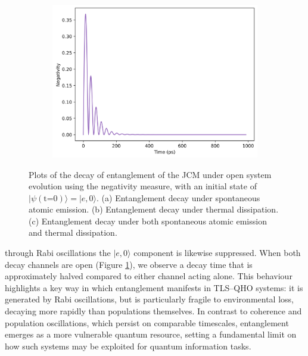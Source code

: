 \documentclass[11pt]{article}
\begin{document}
\begin{figure}[H]
    \vspace{0.5cm}
    
    \begin{subfigure}{0.45\textwidth}
        \centering
        \includegraphics[width=\linewidth]{Research Project/Code/results/JCM/OQS_Neg_Both.png}
        \caption{}
        \label{fig:JCM_OQS_Neg_Both}
    \end{subfigure}
    \hfill
    \caption{Plots of the decay of entanglement of the JCM under open system evolution using the negativity measure, with an initial state of $|\psi (\text{t=0})\rangle = |e, 0\rangle$. (a) Entanglement decay under spontaneous atomic emission. (b) Entanglement decay under thermal dissipation. (c) Entanglement decay under both spontaneous atomic emission and thermal dissipation.}
    \label{fig:JCM_OQS_Neg}
\end{figure}

\noindent through Rabi oscillations the $|e,0\rangle$ component is likewise suppressed. When both decay channels are open (Figure \ref{fig:JCM_OQS_Neg_Both}), we observe a decay time that is approximately halved compared to either channel acting alone. This behaviour highlights a key way in which entanglement manifests in TLS--QHO systems: it is generated by Rabi oscillations, but is particularly fragile to environmental loss, decaying more rapidly than populations themselves. In contrast to coherence and population oscillations, which persist on comparable timescales, entanglement emerges as a more vulnerable quantum resource, setting a fundamental limit on how such systems may be exploited for quantum information tasks.
\end{document}
